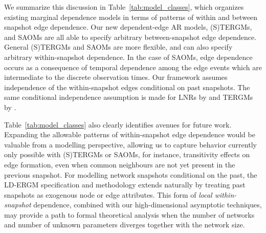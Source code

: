 \documentclass[12pt]{article}
\newcommand{\0}{{\bf 0}}
\begin{document}
We summarize this discussion in Table~\ref{tab:model_classes}, which organizes existing marginal dependence models in terms of patterns of within and between snapshot edge dependence. Our new dependent-edge AR models, (S)TERGMs, and SAOMs are all able to specify arbitrary between-snapshot edge dependence. 
General (S)TERGMs and SAOMs are more flexible, and can also specify arbitrary within-snapshot dependence.
In the case of SAOMs, edge dependence occurs as a consequence of temporal dependence among the edge events which are intermediate to the discrete observation times.
Our framework assumes independence of the within-snapshot edges conditional on past snapshots. %
The same conditional independence assumption is made for LNRs by \cite{almquist2014logistic_supp} and TERGMs by \cite{Hanneke2010_supp}.

Table~\ref{tab:model_classes} also clearly identifies avenues for future work.
Expanding the allowable patterns of within-snapshot edge dependence would be valuable from a modelling perspective, allowing us to capture behavior currently only possible with (S)TERGMs or SAOMs, for instance, transitivity effects on edge formation, even when common neighbours are not yet present in the previous snapshot.
For modelling network snapshots conditional on the past, the LD-ERGM specification and methodology extends naturally by treating past snapshots as exogenous node or edge attributes. 
This form of {\em local within-snapshot} dependence, combined with our high-dimensional asymptotic techniques, may provide a path to formal theoretical analysis when the number of networks and number of unknown parameters diverges together with the network size.

\end{document}
